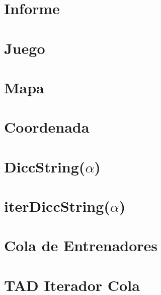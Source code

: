 \documentclass[a4paper,10pt]{article}
\begin{document}
\maketitle

\thispagestyle{fancy}
\tableofcontents


\pagebreak

\section{Informe}


\pagebreak

\section{Juego}


\pagebreak

\section{Mapa}


\pagebreak

\section{Coordenada}


\pagebreak

\section{DiccString($\alpha$)}


\pagebreak

\section{iterDiccString($\alpha$)}


\pagebreak

\section{Cola de Entrenadores}

\pagebreak

\pagebreak


\pagebreak

\section{TAD Iterador Cola}

%
\end{document}
